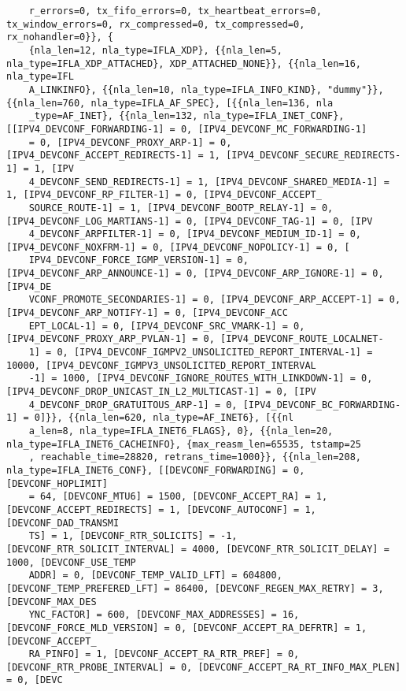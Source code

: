 \documentclass[pdf, unicode, 12pt, a4paper,oneside,fleqn]{article}
\begin{document}
{\begin{verbatim}
    r_errors=0, tx_fifo_errors=0, tx_heartbeat_errors=0, tx_window_errors=0, rx_compressed=0, tx_compressed=0, rx_nohandler=0}}, {
    {nla_len=12, nla_type=IFLA_XDP}, {{nla_len=5, nla_type=IFLA_XDP_ATTACHED}, XDP_ATTACHED_NONE}}, {{nla_len=16, nla_type=IFL
    A_LINKINFO}, {{nla_len=10, nla_type=IFLA_INFO_KIND}, "dummy"}}, {{nla_len=760, nla_type=IFLA_AF_SPEC}, [{{nla_len=136, nla
    _type=AF_INET}, {{nla_len=132, nla_type=IFLA_INET_CONF}, [[IPV4_DEVCONF_FORWARDING-1] = 0, [IPV4_DEVCONF_MC_FORWARDING-1]
    = 0, [IPV4_DEVCONF_PROXY_ARP-1] = 0, [IPV4_DEVCONF_ACCEPT_REDIRECTS-1] = 1, [IPV4_DEVCONF_SECURE_REDIRECTS-1] = 1, [IPV
    4_DEVCONF_SEND_REDIRECTS-1] = 1, [IPV4_DEVCONF_SHARED_MEDIA-1] = 1, [IPV4_DEVCONF_RP_FILTER-1] = 0, [IPV4_DEVCONF_ACCEPT_
    SOURCE_ROUTE-1] = 1, [IPV4_DEVCONF_BOOTP_RELAY-1] = 0, [IPV4_DEVCONF_LOG_MARTIANS-1] = 0, [IPV4_DEVCONF_TAG-1] = 0, [IPV
    4_DEVCONF_ARPFILTER-1] = 0, [IPV4_DEVCONF_MEDIUM_ID-1] = 0, [IPV4_DEVCONF_NOXFRM-1] = 0, [IPV4_DEVCONF_NOPOLICY-1] = 0, [
    IPV4_DEVCONF_FORCE_IGMP_VERSION-1] = 0, [IPV4_DEVCONF_ARP_ANNOUNCE-1] = 0, [IPV4_DEVCONF_ARP_IGNORE-1] = 0, [IPV4_DE
    VCONF_PROMOTE_SECONDARIES-1] = 0, [IPV4_DEVCONF_ARP_ACCEPT-1] = 0, [IPV4_DEVCONF_ARP_NOTIFY-1] = 0, [IPV4_DEVCONF_ACC
    EPT_LOCAL-1] = 0, [IPV4_DEVCONF_SRC_VMARK-1] = 0, [IPV4_DEVCONF_PROXY_ARP_PVLAN-1] = 0, [IPV4_DEVCONF_ROUTE_LOCALNET-
    1] = 0, [IPV4_DEVCONF_IGMPV2_UNSOLICITED_REPORT_INTERVAL-1] = 10000, [IPV4_DEVCONF_IGMPV3_UNSOLICITED_REPORT_INTERVAL
    -1] = 1000, [IPV4_DEVCONF_IGNORE_ROUTES_WITH_LINKDOWN-1] = 0, [IPV4_DEVCONF_DROP_UNICAST_IN_L2_MULTICAST-1] = 0, [IPV
    4_DEVCONF_DROP_GRATUITOUS_ARP-1] = 0, [IPV4_DEVCONF_BC_FORWARDING-1] = 0]}}, {{nla_len=620, nla_type=AF_INET6}, [{{nl
    a_len=8, nla_type=IFLA_INET6_FLAGS}, 0}, {{nla_len=20, nla_type=IFLA_INET6_CACHEINFO}, {max_reasm_len=65535, tstamp=25
    , reachable_time=28820, retrans_time=1000}}, {{nla_len=208, nla_type=IFLA_INET6_CONF}, [[DEVCONF_FORWARDING] = 0, [DEVCONF_HOPLIMIT]
    = 64, [DEVCONF_MTU6] = 1500, [DEVCONF_ACCEPT_RA] = 1, [DEVCONF_ACCEPT_REDIRECTS] = 1, [DEVCONF_AUTOCONF] = 1, [DEVCONF_DAD_TRANSMI
    TS] = 1, [DEVCONF_RTR_SOLICITS] = -1, [DEVCONF_RTR_SOLICIT_INTERVAL] = 4000, [DEVCONF_RTR_SOLICIT_DELAY] = 1000, [DEVCONF_USE_TEMP
    ADDR] = 0, [DEVCONF_TEMP_VALID_LFT] = 604800, [DEVCONF_TEMP_PREFERED_LFT] = 86400, [DEVCONF_REGEN_MAX_RETRY] = 3, [DEVCONF_MAX_DES
    YNC_FACTOR] = 600, [DEVCONF_MAX_ADDRESSES] = 16, [DEVCONF_FORCE_MLD_VERSION] = 0, [DEVCONF_ACCEPT_RA_DEFRTR] = 1, [DEVCONF_ACCEPT_
    RA_PINFO] = 1, [DEVCONF_ACCEPT_RA_RTR_PREF] = 0, [DEVCONF_RTR_PROBE_INTERVAL] = 0, [DEVCONF_ACCEPT_RA_RT_INFO_MAX_PLEN] = 0, [DEVC

\end{verbatim}}
\end{document}
